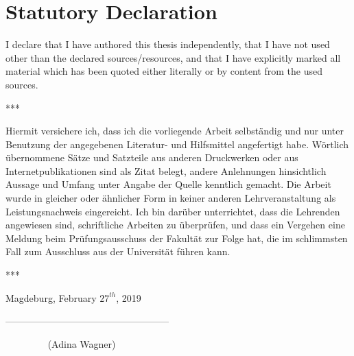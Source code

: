 \documentclass[a4paper, 12pt]{scrreprt}
\begin{document}





\chapter*{Statutory Declaration}

I declare that I have authored this thesis independently, that I have not used
other than the declared sources/resources, and that I have explicitly marked
all material which has been quoted either literally or by content from the
used sources.

\bigskip

\begin{center}
	***
\end{center}

\bigskip

Hiermit versichere ich, dass ich die vorliegende Arbeit selbständig und nur
unter Benutzung der angegebenen Literatur- und Hilfsmittel angefertigt
habe. Wörtlich übernommene Sätze und Satzteile aus anderen Druckwerken
oder aus Internetpublikationen sind als Zitat belegt, andere Anlehnungen
hinsichtlich Aussage und Umfang unter Angabe der Quelle kenntlich gemacht.
Die Arbeit wurde in gleicher oder ähnlicher Form in keiner anderen
Lehrveranstaltung als Leistungsnachweis eingereicht.
Ich bin darüber unterrichtet, dass die Lehrenden angewiesen sind, schriftliche
 Arbeiten zu überprüfen, und dass ein Vergehen eine Meldung beim
Prüfungsausschuss der Fakultät zur Folge hat, die im schlimmsten Fall zum
Ausschluss aus der Universität führen kann.

\bigskip

\begin{center}
	***
\end{center}

\bigskip

Magdeburg, February $27^{th}$, 2019

\bigskip

\bigskip

\bigskip

---------------------------------------------------

$\phantom{mmmm..}$  (Adina Wagner)
\end{document}
